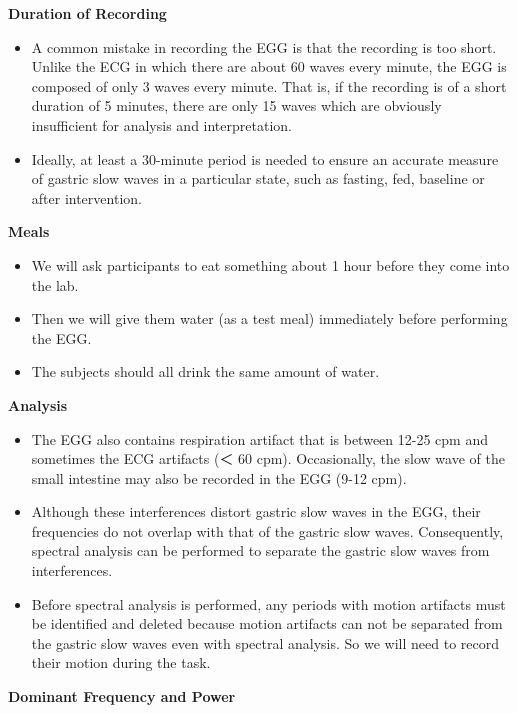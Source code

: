 \documentclass[]{book}
\providecommand{\tightlist}{%
  \setlength{\itemsep}{0pt}\setlength{\parskip}{0pt}}
\begin{document}
\textbf{Duration of Recording}

\begin{itemize}
\tightlist
\item
  A common mistake in recording the EGG is that the recording is too
  short. Unlike the ECG in which there are about 60 waves every minute,
  the EGG is composed of only 3 waves every minute. That is, if the
  recording is of a short duration of 5 minutes, there are only 15 waves
  which are obviously insufficient for analysis and interpretation.
\item
  Ideally, at least a 30-minute period is needed to ensure an accurate
  measure of gastric slow waves in a particular state, such as fasting,
  fed, baseline or after intervention.
\end{itemize}

\textbf{Meals}

\begin{itemize}
\tightlist
\item
  We will ask participants to eat something about 1 hour before they
  come into the lab.
\item
  Then we will give them water (as a test meal) immediately before
  performing the EGG.
\item
  The subjects should all drink the same amount of water.
\end{itemize}

\textbf{Analysis}

\begin{itemize}
\tightlist
\item
  The EGG also contains respiration artifact that is between 12-25 cpm
  and sometimes the ECG artifacts (＜ 60 cpm). Occasionally, the slow
  wave of the small intestine may also be recorded in the EGG (9-12
  cpm).
\item
  Although these interferences distort gastric slow waves in the EGG,
  their frequencies do not overlap with that of the gastric slow waves.
  Consequently, spectral analysis can be performed to separate the
  gastric slow waves from interferences.
\item
  Before spectral analysis is performed, any periods with motion
  artifacts must be identified and deleted because motion artifacts can
  not be separated from the gastric slow waves even with spectral
  analysis. So we will need to record their motion during the task.
\end{itemize}

\textbf{Dominant Frequency and Power}
\end{document}
